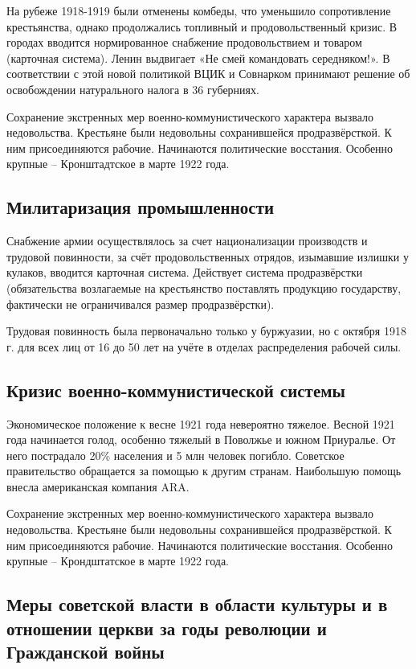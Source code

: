 На рубеже 1918-1919 были отменены комбеды, что уменьшило сопротивление крестьянства, однако продолжались топливный и продовольственный кризис. В городах вводится нормированное снабжение продовольствием и товаром (карточная система). Ленин выдвигает «Не смей командовать середняком!». В соответствии с этой новой политикой ВЦИК и Совнарком принимают решение об освобождении натурального налога в 36 губерниях.

Сохранение экстренных мер военно-коммунистического характера вызвало недовольства. Крестьяне были недовольны сохранившейся продразвёрсткой. К ним присоединяются рабочие. Начинаются политические восстания. Особенно крупные – Кронштадтское в марте 1922 года.

\subsection{Милитаризация промышленности}

Снабжение армии осуществлялось за счет национализации производств и трудовой повинности, за счёт продовольственных отрядов, изымавшие излишки у кулаков, вводится карточная система. Действует система продразвёрстки (обязательства возлагаемые на крестьянство поставлять продукцию государству, фактически не ограничивался размер продразвёрстки).

Трудовая повинность была первоначально только у буржуазии, но с октября 1918 г. для всех лиц от 16 до 50 лет на учёте в отделах распределения рабочей силы.

\subsection{Кризис военно-коммунистической системы}
Экономическое положение к весне 1921 года невероятно тяжелое. Весной 1921 года начинается голод, особенно тяжелый в Поволжье и южном Приуралье. От него пострадало 20\% населения и 5 млн человек погибло. Советское правительство обращается за помощью к другим странам. Наибольшую помощь внесла американская компания ARA.

Сохранение экстренных мер военно-коммунистического характера вызвало недовольства. Крестьяне были недовольны сохранившейся продразвёрсткой. К ним присоединяются рабочие. Начинаются политические восстания. Особенно крупные – Крондштатское в марте 1922 года.

\subsection{Меры советской власти в области культуры и в отношении церкви за годы революции и Гражданской войны}

